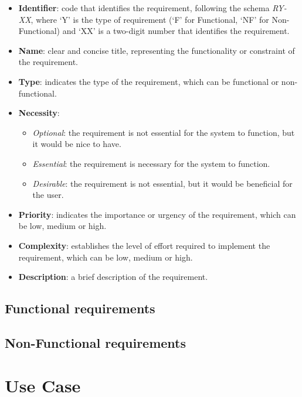 \begin{itemize}
    \item \textbf{Identifier}: code that identifies the requirement, following the schema \textit{RY-XX}, where `Y' is the type of requirement (`F' for Functional, `NF' for Non-Functional) and `XX' is a two-digit number that identifies the requirement.
    \item \textbf{Name}: clear and concise title, representing the functionality or constraint of the requirement.
    \item \textbf{Type}: indicates the type of the requirement, which can be functional or non-functional.
    \item \textbf{Necessity}: 
        \begin{itemize}
            \item \textit{Optional}: the requirement is not essential for the system to function, but it would be nice to have.
            \item \textit{Essential}: the requirement is necessary for the system to function.
            \item \textit{Desirable}: the requirement is not essential, but it would be beneficial for the user.
        \end{itemize}
    \item \textbf{Priority}: indicates the importance or urgency of the requirement, which can be low, medium or high.
    \item \textbf{Complexity}: establishes the level of effort required to implement the requirement, which can be low, medium or high.
    \item \textbf{Description}: a brief description of the requirement.
\end{itemize}


\subsection{Functional requirements}



\subsection{Non-Functional requirements}




\section{Use Case}\label{sec:use-case}

